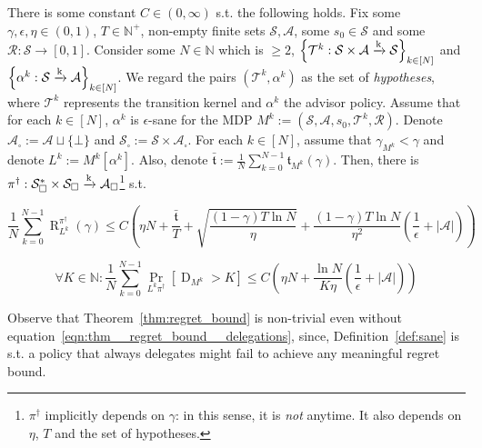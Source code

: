\documentclass[anon,12pt]{colt2018} %
\newcommand{\AP}[1]{\left(#1\right)}
\newcommand{\AB}[1]{\left[#1\right]}
\newcommand{\AC}[1]{\left\{#1\right\}}
\newcommand{\Pa}[2]{\underset{#1}{\operatorname{Pr}}\AB{#2}}
\newcommand{\Nats}{\mathbb{N}}
\newcommand{\Abs}[1]{\left\vert #1 \right\vert}
\newcommand{\K}{\xrightarrow{\textnormal{k}}}
\newcommand{\A}{\mathcal{A}}
\newcommand{\St}{\mathcal{S}}
\newcommand{\T}{\mathcal{T}}
\newcommand{\R}{\mathcal{R}}
\newcommand{\Rg}{\operatorname{R}}
\newcommand{\MP}[2]{#1#2}
\newcommand{\MA}[2]{#1\AB{#2}}
\newcommand{\Tn}{\mathfrak{t}}
\newcommand{\Ad}{\alpha}
\newcommand{\ND}{\operatorname{D}}
\begin{document}
\begin{samepage}
\begin{theorem}
\label{thm:regret_bound}

There is some constant $C \in (0,\infty)$ s.t. the following holds. Fix some $\gamma,\epsilon,\eta \in (0,1)$, $T\in\Nats^+$, non-empty finite sets $\St,\A$, some $s_0 \in \St$ and some $\R: \St \rightarrow [0,1]$. Consider some $N \in \Nats$ which is $\geq 2$, $\AC{\T^k: \St \times \A \K \St}_{k\in[N]}$ and $\AC{\Ad^k :\St \K \A}_{k\in[N]}$. We regard the pairs $(\T^k,\Ad^k)$ as the set of \emph{hypotheses}, where $\T^k$ represents the transition kernel and $\Ad^k$ the advisor policy. Assume that for each $k\in[N]$, $\Ad^k$ is $\epsilon$-sane for the MDP $M^k:=\AP{\St,\A,s_0,\T^k,\R}$. Denote $\A_\square:=\A\sqcup\{\bot\}$ and $\St_\square:=\St \times \A_\square$. For each $k \in [N]$, assume that $\gamma_{M^k} < \gamma$ and denote $L^k:=\MA{M^k}{\Ad^k}$. Also, denote $\bar{\Tn}:=\frac{1}{N}\sum_{k=0}^{N-1} \Tn_{M^k}(\gamma)$. Then, there is $\pi^\dagger: \St_\square^* \times \St_\square \K \A_\square$\footnote{$\pi^\dagger$ implicitly depends on $\gamma$: in this sense, it is \emph{not} anytime. It also depends on $\eta$, $T$ and the set of hypotheses.} s.t.

\begin{equation}
\label{eqn:thm__regret_bound__regret}
\frac{1}{N}\sum_{k=0}^{N-1}\Rg_{L^k}^{\pi^\dagger}(\gamma) \leq C\AP{\eta N+\frac{\bar{\Tn}}{T}+\sqrt{\frac{(1-\gamma) T \ln{N}}{\eta}}+\frac{(1-\gamma)T \ln{N}}{\eta^2}\AP{\frac{1}{\epsilon}+\Abs{\A}}}
\end{equation}


\begin{equation}
\label{eqn:thm__regret_bound__delegations}
\forall K \in \Nats: \frac{1}{N}\sum_{k=0}^{N-1}\Pa{\MP{L^k}{\pi^\dagger}}{\ND_{M^k} > K} \leq C\AP{\eta N +\frac{\ln{N}}{K\eta}\AP{\frac{1}{\epsilon}+\Abs{\A}}}
\end{equation}

\end{theorem}
\end{samepage}

Observe that Theorem~\ref{thm:regret_bound} is non-trivial even without equation~\ref{eqn:thm__regret_bound__delegations}, since, Definition~\ref{def:sane} is s.t. a policy that always delegates might fail to achieve any meaningful regret bound.
\end{document}
